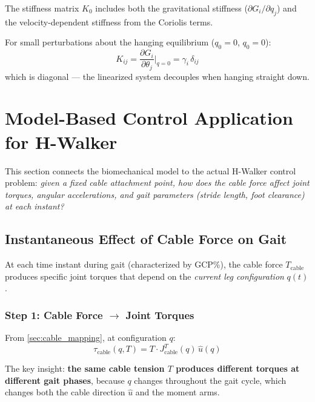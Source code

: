 \documentclass[11pt,a4paper]{article}
\newcommand{\vc}[1]{\bm{#1}}
\newcommand{\dt}[1]{\dot{#1}}
\newcommand{\pder}[2]{\frac{\partial #1}{\partial #2}}
\def\vc#1{#1}%
\def\dt#1{#1}%
\def\bm#1{#1}%
\begin{document}
The stiffness matrix $\vc{K}_0$ includes both the gravitational stiffness
($\partial G_i / \partial q_j$) and the velocity-dependent stiffness from
the Coriolis terms.

For small perturbations about the hanging equilibrium ($\vc{q}_0 = \vc{0}$,
$\dt{\vc{q}}_0 = \vc{0}$):
\begin{equation}
    K_{ij} = \pder{G_i}{\theta_j}\bigg|_{\vc{q}=\vc{0}} = \gamma_i \, \delta_{ij}
\end{equation}
which is diagonal --- the linearized system decouples when hanging straight down.

\section{Model-Based Control Application for H-Walker}
\label{sec:control_application}

This section connects the biomechanical model to the actual H-Walker
control problem: \textit{given a fixed cable attachment point, how does
the cable force affect joint torques, angular accelerations, and gait
parameters (stride length, foot clearance) at each instant?}

\subsection{Instantaneous Effect of Cable Force on Gait}

At each time instant during gait (characterized by GCP\%), the cable
force $T_{\text{cable}}$ produces specific joint torques that depend on
the \textit{current leg configuration} $\vc{q}(t)$.

\subsubsection*{Step 1: Cable Force $\to$ Joint Torques}

From \cref{sec:cable_mapping}, at configuration $\vc{q}$:
\begin{equation}
    \vc{\tau}_{\text{cable}}(\vc{q}, T) = T \cdot \vc{J}_{\text{cable}}^T(\vc{q}) \, \hat{\vc{u}}(\vc{q})
    \label{eq:cable_tau_instant}
\end{equation}

The key insight: \textbf{the same cable tension $T$ produces different
torques at different gait phases}, because $\vc{q}$ changes throughout
the gait cycle, which changes both the cable direction $\hat{\vc{u}}$
and the moment arms.
\end{document}
